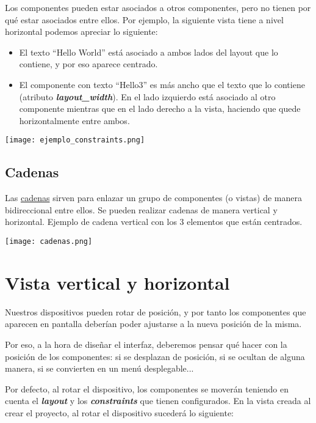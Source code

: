 Los componentes pueden estar asociados a otros componentes, pero no tienen por qué estar asociados entre ellos. Por ejemplo, la siguiente vista tiene a nivel horizontal podemos apreciar lo siguiente:
\begin{itemize}
    \item El texto “Hello World” está asociado a ambos lados del layout que lo contiene, y por eso aparece centrado.
    \item El componente con texto “Hello3” es más ancho que el texto que lo contiene (atributo \textit{\textbf{layout\_width}}). En el lado izquierdo está asociado al otro componente mientras que en el lado derecho a la vista, haciendo que quede horizontalmente entre ambos.
\end{itemize}

\begin{center}
    \texttt{[image: ejemplo\_constraints.png]}
\end{center}
\vspace{-15pt}
\subsection{Cadenas}

Las \href{https://developer.android.com/develop/ui/views/layout/constraint-layout#constrain-chain}{cadenas} sirven para enlazar un grupo de componentes (o vistas) de manera bidireccional entre ellos. Se pueden realizar cadenas de manera vertical y horizontal. Ejemplo de cadena vertical con los 3 elementos que están centrados.

\begin{center}
    \texttt{[image: cadenas.png]}
\end{center}


\section{Vista vertical y horizontal}

Nuestros dispositivos pueden rotar de posición, y por tanto los componentes que aparecen en pantalla deberían poder ajustarse a la nueva posición de la misma.

Por eso, a la hora de diseñar el interfaz, deberemos pensar qué hacer con la posición de los componentes: si se desplazan de posición, si se ocultan de alguna manera, si se convierten en un menú desplegable...

Por defecto, al rotar el dispositivo, los componentes se moverán teniendo en cuenta el \textit{\textbf{layout}} y los \textit{\textbf{constraints}} que tienen configurados. En la vista creada al crear el proyecto, al rotar el dispositivo sucederá lo siguiente:

